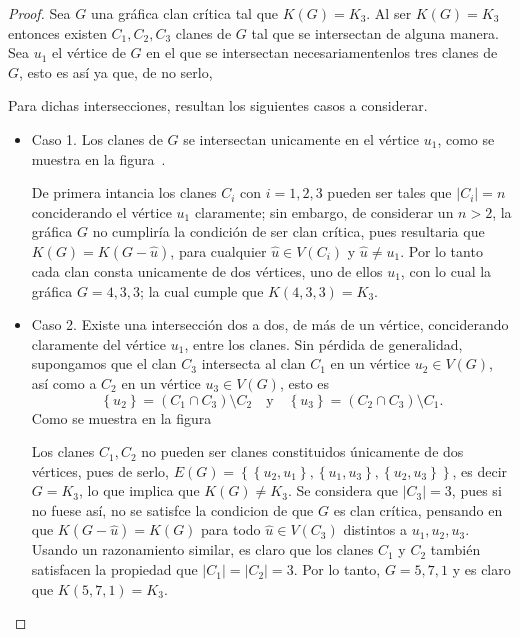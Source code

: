 \documentclass[12pt]{book}
\theoremstyle{definition}
\begin{document}
\begin{proof}
Sea $G$ una gráfica clan crítica tal que $K(G)=K_3$. Al ser $K(G)=K_3$ entonces existen $C_1,C_2,C_3$ clanes de $G$ tal que se intersectan de alguna manera.
Sea $u_1$ el vértice de $G$ en el que se intersectan necesariamentenlos tres clanes de $G$, esto es así ya que, de no serlo, %

Para dichas intersecciones, resultan los siguientes casos a considerar.
\begin{itemize}
\item Caso 1. 
Los clanes de $G$ se intersectan unicamente en el vértice $u_1$, como se muestra en la figura~.




De primera intancia los clanes $C_i$ con $i=1,2,3$ pueden ser tales que $|C_i|=n$ conciderando el vértice $u_1$ claramente; sin embargo, de considerar un $n>2$, la gráfica $G$ no cumpliría la condición de ser clan crítica, pues resultaria que $K(G)=K(G-\hat{u})$, para cualquier $\hat{u}\in V(C_i)$ y $\hat{u}\neq u_1$. Por lo tanto cada clan consta unicamente de dos vértices, uno de ellos $u_1$, con lo cual la gráfica $G=4,3,3$; la cual cumple que $K(4,3,3)=K_3$.

\item Caso 2.
Existe una intersección dos a dos, de más de un vértice, conciderando claramente del vértice $u_1$, entre los clanes. Sin pérdida de generalidad, supongamos que el clan $C_3$ intersecta al clan $C_1$ en un vértice $u_2\in V(G)$, así como a $C_2$ en un vértice $u_3\in V(G)$, esto es 
\begin{equation*}
\left\{u_2\right\}=(C_1\cap C_3)\setminus C_2 \quad \text{y} \quad \left\{u_3\right\}=(C_2\cap C_3)\setminus C_1.
\end{equation*}
Como se muestra en la figura~



Los clanes $C_1,C_2$ no pueden ser clanes constituidos únicamente de dos vértices, pues de serlo, $E(G)=\left\{\left\{u_2,u_1\right\},\left\{u_1,u_3\right\},\left\{u_2,u_3\right\}\right\}$, es decir $G=K_3$, lo que implica que $K(G)\neq K_3$. Se considera que $|C_3|=3$, pues si no fuese así, no se satisfce la condicion de que $G$ es clan crítica, pensando en que $K(G-\hat{u})=K(G)$ para todo $\hat{u}\in V(C_3)$ distintos a $u_1,u_2,u_3$. Usando un razonamiento similar, es claro que los clanes $C_1$ y $C_2$ también satisfacen la propiedad que $|C_1|=|C_2|=3$. Por lo tanto, $G=5,7,1$ y es claro que $K(5,7,1)=K_3$.



\end{itemize}
\end{proof}
\end{document}
